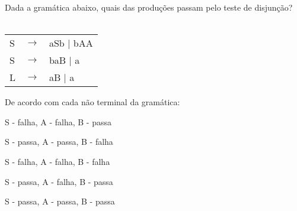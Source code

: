 \question[10]
Dada a gramática abaixo, quais das produções passam pelo teste de disjunção?\\
\\
\begin{tabular}{|l c l}
	S & $\rightarrow$ & aSb | bAA \\
    S & $\rightarrow$ & b{aB} | a \\
	L & $\rightarrow$ & aB | a \\
\end{tabular}

De acordo com cada não terminal da gramática:
\begin{choices}
\item S - falha, A - falha, B - passa
\item S - passa, A - passa, B - falha %
\item S - falha, A - falha, B - falha
\item S - passa, A - falha, B - passa
\item S - passa, A - passa, B - passa
\end{choices}
\answerline
